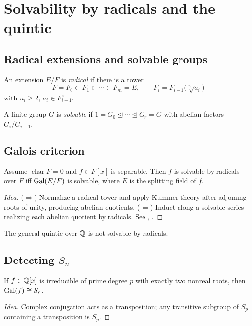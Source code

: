 \section{Solvability by radicals and the quintic}\label{sec:radicals-quintic}

\subsection{Radical extensions and solvable groups}
\begin{definition}
An extension $E/F$ is \emph{radical} if there is a tower
\[
F=F_0\subset F_1\subset\cdots\subset F_m=E,\qquad
F_i=F_{i-1}\bigl(\sqrt[n_i]{a_i}\bigr)
\]
with $n_i\ge2$, $a_i\in F_{i-1}^\times$.
\end{definition}
\begin{definition}
A finite group $G$ is \emph{solvable} if $1=G_0\trianglelefteq\cdots\trianglelefteq G_r=G$ with abelian factors $G_i/G_{i-1}$.
\end{definition}

\subsection{Galois criterion}
\begin{theorem}\label{thm:radicals-criterion}
Assume $\operatorname{char}F=0$ and $f\in F[x]$ is separable. Then $f$ is solvable by radicals over $F$ iff $\operatorname{Gal}(E/F)$ is solvable, where $E$ is the splitting field of $f$.
\end{theorem}
\begin{proof}[Idea]
($\Rightarrow$) Normalize a radical tower and apply Kummer theory after adjoining roots of unity, producing abelian quotients. ($\Leftarrow$) Induct along a solvable series realizing each abelian quotient by radicals. See \cite[Ch.~14]{DF}, \cite[Ch.~VI]{Artin}.
\end{proof}
\begin{theorem}
The general quintic over $\mathbb{Q}$ is not solvable by radicals.
\end{theorem}

\subsection{Detecting $S_n$}
\begin{proposition}
If $f\in\mathbb{Q}[x]$ is irreducible of prime degree $p$ with exactly two nonreal roots, then $\operatorname{Gal}(f)\cong S_p$.
\end{proposition}
\begin{proof}[Idea]
Complex conjugation acts as a transposition; any transitive subgroup of $S_p$ containing a transposition is $S_p$.
\end{proof}
